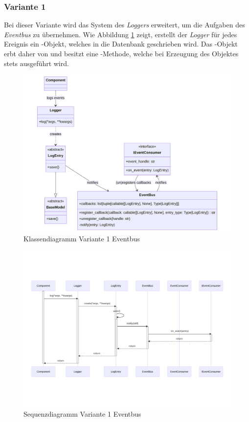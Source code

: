 \subsubsection*{Variante 1}

Bei dieser Variante wird das System des \emph{Loggers} erweitert, um die Aufgaben des \emph{Eventbus} zu übernehmen. Wie Abbildung \ref{fig:eventbus-v1-class} zeigt, erstellt der \emph{Logger} für jedes Ereignis ein -Objekt, welches in die Datenbank geschrieben wird. Das -Objekt erbt daher von  und besitzt eine -Methode, welche bei Erzeugung des Objektes stets ausgeführt wird.

\begin{figure}[!hb]
	\centering
	\includegraphics[width=0.75\linewidth]{images/diagrams/eventbus-v1-class.png}
	\caption{Klassendiagramm Variante 1 Eventbus}
	\label{fig:eventbus-v1-class}
\end{figure}

\begin{figure}[!hb]
	\centering
	\includegraphics[width=0.75\linewidth]{images/diagrams/eventbus-v1-seq.png}
	\caption{Sequenzdiagramm Variante 1 Eventbus}
	\label{fig:eventbus-v1-seq}
\end{figure}

